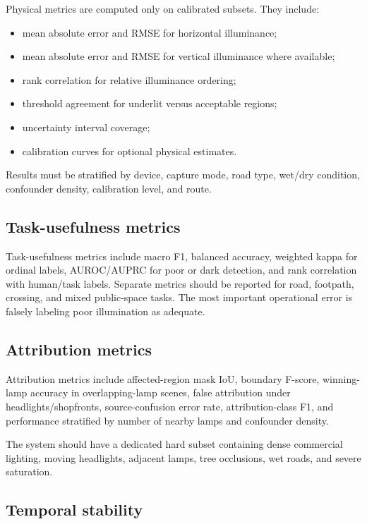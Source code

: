 \documentclass[11pt]{article}
\begin{document}
Physical metrics are computed only on calibrated subsets. They include:
\begin{itemize}
  \item mean absolute error and RMSE for horizontal illuminance;
  \item mean absolute error and RMSE for vertical illuminance where available;
  \item rank correlation for relative illuminance ordering;
  \item threshold agreement for underlit versus acceptable regions;
  \item uncertainty interval coverage;
  \item calibration curves for optional physical estimates.
\end{itemize}

Results must be stratified by device, capture mode, road type, wet/dry condition, confounder density, calibration level, and route.

\subsection{Task-usefulness metrics}

Task-usefulness metrics include macro F1, balanced accuracy, weighted kappa for ordinal labels, AUROC/AUPRC for poor or dark detection, and rank correlation with human/task labels. Separate metrics should be reported for road, footpath, crossing, and mixed public-space tasks. The most important operational error is falsely labeling poor illumination as adequate.

\subsection{Attribution metrics}

Attribution metrics include affected-region mask IoU, boundary F-score, winning-lamp accuracy in overlapping-lamp scenes, false attribution under headlights/shopfronts, source-confusion error rate, attribution-class F1, and performance stratified by number of nearby lamps and confounder density.

The system should have a dedicated hard subset containing dense commercial lighting, moving headlights, adjacent lamps, tree occlusions, wet roads, and severe saturation.

\subsection{Temporal stability}
\end{document}
